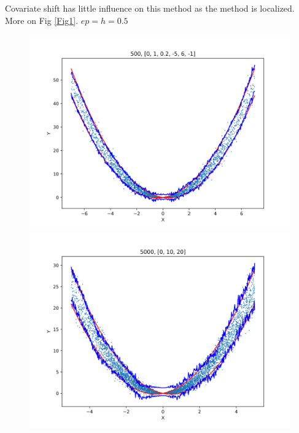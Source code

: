 \documentclass[12pt, a4paper, oneside]{article}
\begin{document}
    Covariate shift has little influence on this method as the method is localized. More on Fig \ref{Fig1}. $ep=h=0.5$
    \begin{figure}[htbp]
        \centering
        \begin{minipage}{0.495\linewidth}
            \centering
            \includegraphics[width=0.98\linewidth]{fig/Ex1_1/0_1_.png}
        \end{minipage}
        \begin{minipage}{0.495\linewidth}
            \centering
            \includegraphics[width=0.98\linewidth]{fig/Ex1_1/0_10_20.png}
        \end{minipage}
        \centering
        \begin{minipage}{0.495\linewidth}

\end{minipage}
\end{figure}
\end{document}

